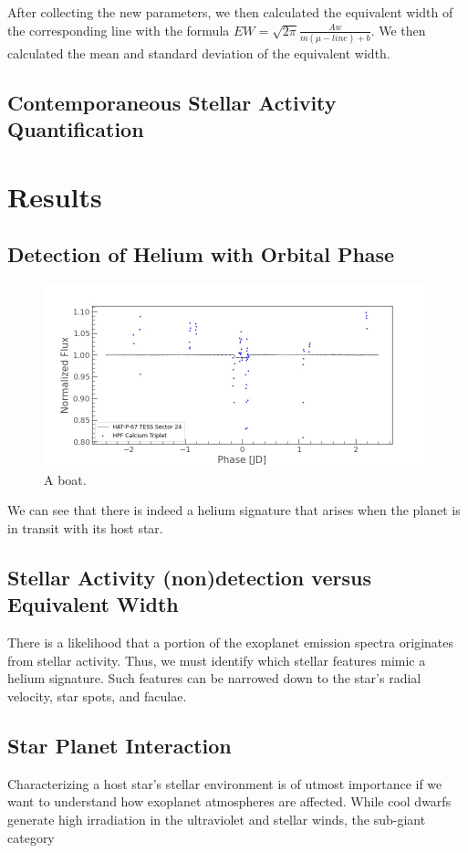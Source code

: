\documentclass[twocolumn]{aastex631}
\begin{document}
After collecting the new parameters, we then calculated the equivalent width of the corresponding line with the formula $EW=\sqrt{2\pi}\frac{Aw}{m(\mu-line)+b}$. We then calculated the mean and standard deviation of the equivalent width.
\subsection{Contemporaneous Stellar Activity Quantification}



\section{Results}
\subsection{Detection of Helium with Orbital Phase}
\begin{figure}
    \includegraphics[width=\linewidth]{figures/TESS_EW_HAT-P-67.jpg}
    \caption{A boat.}
    \label{fig:boat1}
\end{figure}
We can see that there is indeed a helium signature that arises when the planet is in transit with its host star.
\subsection{Stellar Activity (non)detection versus Equivalent Width}
There is a likelihood that a portion of the exoplanet emission spectra originates from stellar activity. Thus, we must identify which stellar features mimic a helium signature. Such features can be narrowed down to the star's radial velocity, star spots, and faculae.
\subsection{Star Planet Interaction}
Characterizing a host star's stellar environment is of utmost importance if we want to understand how exoplanet atmospheres are affected. While cool dwarfs generate high irradiation in the ultraviolet and stellar winds, the sub-giant category
\end{document}
